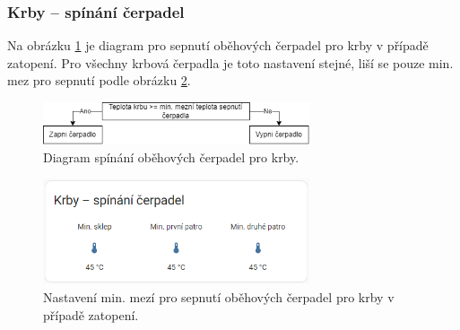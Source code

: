 
\begin{Czech}
\subsubsection{Krby – spínání čerpadel}
\end{Czech}

\begin{Czech}
Na obrázku \ref{fig:diagram-fireplace} je diagram pro sepnutí oběhových čerpadel pro krby v případě zatopení. Pro všechny krbová čerpadla je toto nastavení stejné, liší se pouze min. mez pro sepnutí podle obrázku \ref{fig:fireplace-switching-pumps}.
\end{Czech}

\begin{Czech}
\begin{figure}[H]
    \centering
    \includegraphics[width=0.7\textwidth]{pictures/czech/software/diagram-fireplace.png}
    \caption[]{Diagram spínání oběhových čerpadel pro krby.}
    \label{fig:diagram-fireplace}
\end{figure}
\end{Czech}

\begin{Czech}
\begin{figure}[H]
    \centering
    \includegraphics[width=0.7\textwidth]{pictures/czech/software/fireplace-switching-pumps.png}
    \caption{Nastavení min. mezí pro sepnutí oběhových čerpadel pro krby v případě zatopení.}
    \label{fig:fireplace-switching-pumps}
\end{figure}
\end{Czech}

\begin{Czech}
\end{Czech}

